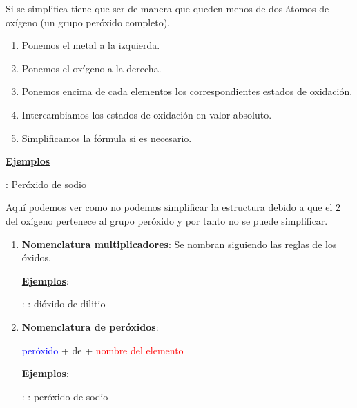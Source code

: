 \documentclass[11pt, a4paper]{article}
\begin{document}
Si se simplifica tiene que ser de manera que  queden menos de dos átomos de oxígeno (un grupo peróxido completo).

\vspace*{2mm}

\begin{enumerate}[label=\itembolascolor{\arabic*}{green!40!black}]
    \item Ponemos el metal a la izquierda.
    \item Ponemos el oxígeno a la derecha.
    \item Ponemos encima de cada elementos los correspondientes estados de oxidación.
    \item Intercambiamos los estados de oxidación en valor absoluto.
    \item Simplificamos la fórmula si es necesario.
\end{enumerate}

\textbf{\uline{Ejemplos}}

 : Peróxido de sodio \ch{->}   \ch{->} 

Aquí podemos ver como no podemos simplificar la estructura debido a que el $2$ del oxígeno pertenece al grupo peróxido y por tanto no se puede simplificar.


\vspace*{2mm}

\begin{enumerate}[label=\itembolascolor{\arabic*}{blue}]
    \item \textbf{\uline{Nomenclatura multiplicadores}}: Se nombran siguiendo las reglas de los óxidos.

          \textbf{\uline{Ejemplos}}:

           : : dióxido de dilitio

    \item \textbf{\uline{Nomenclatura de peróxidos}}:
          \begin{center}
              \textcolor{blue}{peróxido} + de + \textcolor{red}{nombre del elemento}
          \end{center}

          \textbf{\uline{Ejemplos}}:

           : : peróxido de sodio

\end{enumerate}
\end{document}
